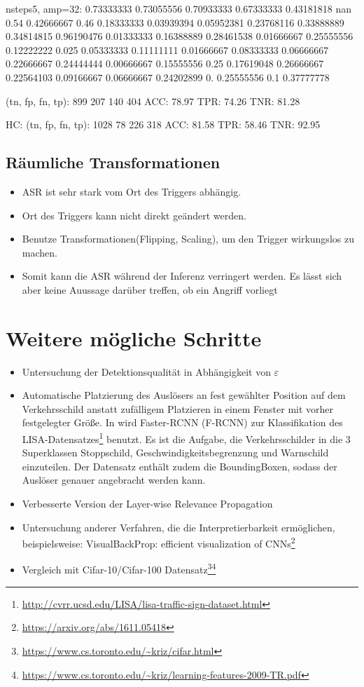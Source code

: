 \documentclass[11pt,a4paper]{article}
\numberwithin{equation}{section}
\begin{document}
	
	
	nsteps5, amp=32:
	0.73333333 0.73055556 0.70933333 0.67333333 0.43181818        nan
	0.54       0.42666667 0.46       0.18333333 0.03939394 0.05952381
	0.23768116 0.33888889 0.34814815 0.96190476 0.01333333 0.16388889
	0.28461538 0.01666667 0.25555556 0.12222222 0.025      0.05333333
	0.11111111 0.01666667 0.08333333 0.06666667 0.22666667 0.24444444
	0.00666667 0.15555556 0.25       0.17619048 0.26666667 0.22564103
	0.09166667 0.06666667 0.24202899 0.         0.25555556 0.1
	0.37777778
	
	
	(tn, fp, fn, tp):  899 207 140 404
	ACC: 78.97
	TPR:  74.26
	TNR:  81.28
	
	HC: (tn, fp, fn, tp):  1028 78 226 318
	ACC: 81.58
	TPR:  58.46
	TNR:  92.95
	
	
	       
	\subsection{Räumliche Transformationen}
	\begin{itemize}
		\item ASR ist sehr stark vom Ort des Triggers abhängig.
		\item Ort des Triggers kann nicht direkt geändert werden.
		\item Benutze Transformationen(Flipping, Scaling), um den Trigger wirkungslos zu machen.
		\item Somit kann die ASR während der Inferenz verringert werden. Es lässt sich aber keine Auussage darüber treffen, ob ein Angriff vorliegt
	\end{itemize}
	\newpage
	\section{Weitere mögliche Schritte} \label{chapter_weitereSchritte}
	\begin{itemize}
		\item Untersuchung der Detektionsqualität in Abhängigkeit von $\varepsilon$
		\item Automatische Platzierung des Auslösers an fest gewählter Position auf dem Verkehrsschild anstatt zufälligem Platzieren in einem Fenster mit vorher festgelegter Größe. In \cite{badnets} wird  Faster-RCNN (F-RCNN) zur Klassifikation des LISA-Datensatzes\footnote{\url{http://cvrr.ucsd.edu/LISA/lisa-traffic-sign-dataset.html}} benutzt. Es ist die Aufgabe, die Verkehrsschilder in die 3 Superklassen Stoppschild, Geschwindigkeitsbegrenzung und Warnschild einzuteilen. Der Datensatz enthält zudem die BoundingBoxen, sodass der Auslöser genauer angebracht werden kann.
		\item Verbesserte Version der Layer-wise Relevance Propagation
		\item Untersuchung anderer Verfahren, die die Interpretierbarkeit ermöglichen, beispielsweise: VisualBackProp: efficient visualization of CNNs\footnote{\url{https://arxiv.org/abs/1611.05418}}
		\item Vergleich mit Cifar-10/Cifar-100 Datensatz\footnote{\url{https://www.cs.toronto.edu/~kriz/cifar.html}}\footnote{\url{https://www.cs.toronto.edu/~kriz/learning-features-2009-TR.pdf}}
	\end{itemize}
	
\end{document}
